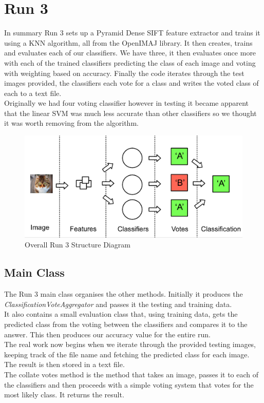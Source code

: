 \documentclass{article}
\begin{document}
	\section{Run 3}
	In summary Run 3 sets up a Pyramid Dense SIFT feature extractor and trains it using a KNN algorithm, all from the OpenIMAJ library. It then creates, trains and evaluates each of our classifiers. We have three, it then evaluates once more with each of the trained classifiers predicting the class of each image and voting with weighting based on accuracy. Finally the code iterates through the test images provided, the classifiers each vote for a class and writes the voted class of each to a text file.\\
	Originally we had four voting classifier however in testing it became apparent that the linear SVM was much less accurate than other classifiers so we thought it was worth removing from the algorithm.
	
	\begin{figure}[h]
		\centering
		\includegraphics[scale=0.4]{structure}
		\caption{Overall Run 3 Structure Diagram}
	\end{figure}
	
	\subsection{Main Class}
	The Run 3 main class organises the other methods. Initially it produces the \textit{ClassificationVoteAggregator} and passes it the testing and training data.\\
	It also contains a small evaluation class that, using training data, gets the predicted class from the voting between the classifiers and compares it to the answer. This then produces our accuracy value for the entire run.\\
	The real work now begins when we iterate through the provided testing images, keeping track of the file name and fetching the predicted class for each image. The result is then stored in a text file.\\
	The collate votes method is the method that takes an image, passes it to each of the classifiers and then proceeds with a simple voting system that votes for the most likely class. It returns the result.
	
\end{document}
